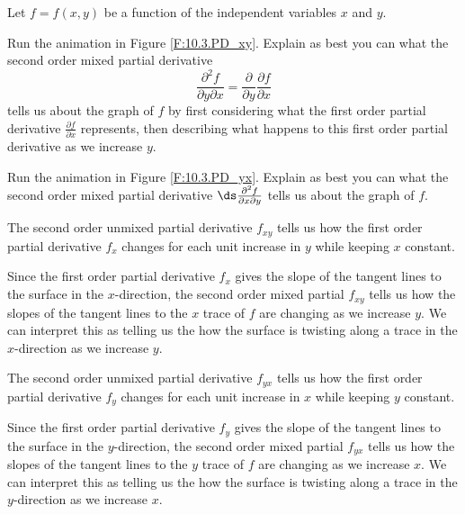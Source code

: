 \begin{activity} \label{A:10.3.3} Let $f = f(x,y)$ be a function of the independent variables $x$ and $y$.
    \ba
	\item Run the animation in Figure \ref{F:10.3.PD_xy}. Explain as best you can what the second order mixed partial derivative
\[\frac{\partial^2 f}{\partial y \partial x} = \frac{\partial}{\partial y} \frac{\partial f}{\partial x}\]
tells us about the graph of $f$ by first considering what the first order partial derivative $\frac{\partial f}{\partial x}$ represents, then
describing what happens to this first order partial derivative as we increase $y$.



    \item Run the animation in Figure \ref{F:10.3.PD_yx}. Explain as best you can what the second order mixed partial derivative $\ds
        \frac{\partial^2
        f}{\partial x \partial y}$ tells us about the graph of $f$.



  \ea

\end{activity}
\begin{smallhint}

\end{smallhint}
\begin{bighint}

\end{bighint}
\begin{activitySolution}
\ba
\item The second order unmixed partial derivative $f_{xy}$ tells us how the first order partial derivative $f_x$ changes for each unit increase in $y$ while keeping $x$ constant. 

Since the first order partial derivative $f_x$ gives the slope of the tangent lines to the surface in the $x$-direction, the second order mixed partial $f_{xy}$ tells us how the slopes of the tangent lines to the $x$ trace of $f$ are changing as we increase $y$. We can interpret this as telling us the   how the surface is twisting along a trace in the $x$-direction as we increase $y$.  

\item The second order unmixed partial derivative $f_{yx}$ tells us how the first order partial derivative $f_y$ changes for each unit increase in $x$ while keeping $y$ constant. 

Since the first order partial derivative $f_y$ gives the slope of the tangent lines to the surface in the $y$-direction, the second order mixed partial $f_{yx}$ tells us how the slopes of the tangent lines to the $y$ trace of $f$ are changing as we increase $x$. We can interpret this as telling us the   how the surface is twisting along a trace in the $y$-direction as we increase $x$.  
\ea
\end{activitySolution}
\aftera
